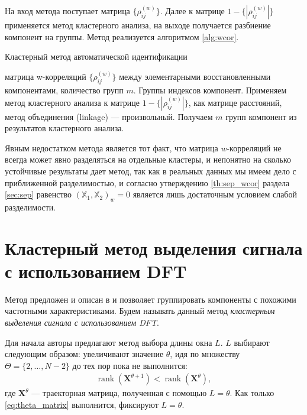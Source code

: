 \documentclass[specialist,
               substylefile = spbu.rtx,
               subf,href,colorlinks=true, 12pt]{disser}
\def\rank{\mathop{\mathrm{rank}}}
\begin{document}
На вход метода поступает матрица $\{\rho^{(w)}_{ij}\}$. Далее к матрице $1 -\{|\rho^{(w)}_{ij}|\}$ применяется метод кластерного анализа, на выходе получается разбиение компонент на группы. Метод реализуется алгоритмом \ref{alg:wcor}.

 \begin{algorithm}[!hhh]
\caption{Кластерный метод автоматической идентификации}
\label{alg:wcor}
\begin{algorithmic}[1]
\REQUIRE матрица w-корреляций $\{\rho^{(w)}_{ij}\}$ между элементарными восстановленными компонентами, количество групп $m$.
\ENSURE Группы индексов компонент.
\STATE  Применяем метод кластерного анализа к матрице $1 -\{|\rho^{(w)}_{ij}|\}$, как матрице расстояний, метод объединения (linkage) --- произвольный.
\STATE Получаем $m$ групп компонент из результатов кластерного анализа.
\end{algorithmic}
\end{algorithm}

Явным недостатком метода является тот факт, что матрица $w$-корреляций не всегда может явно разделяться на отдельные кластеры, и непонятно на сколько устойчивые результаты дает метод, так как в реальных данных мы имеем дело с приближенной разделимостью, и согласно утверждению \ref{th:sep_wcor} раздела \ref{sec:sep} равенство $\left(\mathbb{X}_1, \mathbb{X}_2 \right)_w = 0$ является лишь достаточным условием слабой разделимости.

\section{Кластерный метод выделения сигнала с использованием DFT}
Метод предложен и описан в \cite{Alvarez2013} и позволяет группировать компоненты с похожими частотными характеристиками. Будем называть данный метод \textit{кластерным выделения сигнала с использованием DFT}.

Для начала авторы предлагают метод выбора длины окна $L$.
$L$ выбирают следующим образом: увеличивают значение $\theta$, идя по множеству $\Theta = \{2,\ldots,N -2\}$ до тех пор пока не выполнится:
\begin{gather}
\label{eq:theta_matrix}
\rank(\mathbf{X}^{\theta+1}) < \rank(\mathbf{X}^{\theta}),
\end{gather}
где $\mathbf{X}^{\theta}$ --- траекторная матрица, полученная с помощью $L = \theta$. Как только \eqref{eq:theta_matrix} выполнится, фиксируют $L = \theta$.
\end{document}
